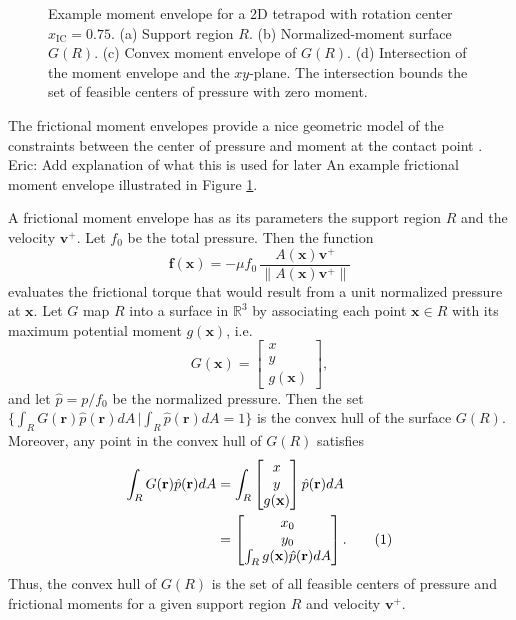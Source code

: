 \documentclass[conference]{IEEEtran}
\newcommand\numberthis{\addtocounter{equation}{1}\tag{\theequation}}
\newcommand{\EH}[1]{{\color{blue} {Eric: {#1}}  }}
\begin{document}
\begin{figure}[t]
\begin{subfigure}[b]{0.24\textwidth}
    \caption{}
  \end{subfigure}
  \caption{Example moment envelope for a 2D tetrapod with rotation
    center $x_{\text{IC}} = 0.75$. (a) Support region $R$. (b)
    Normalized-moment surface $G(R)$. (c) Convex moment envelope of
    $G(R)$. (d) Intersection of the moment envelope and the
    $xy$-plane. The intersection bounds the set of feasible centers of
    pressure with zero moment.}
  \label{fig:moment-envelope}
\end{figure}


The frictional moment envelopes provide a nice geometric model of the
constraints between the center of pressure and moment at the contact
point \cite{Mason}. \EH{Add explanation of what this is used for
  later} An example frictional moment envelope illustrated in Figure
\ref{fig:moment-envelope}.

A frictional moment envelope has as its parameters
the support region $R$ and the velocity $\mathbf{v}^+$.  Let $f_0$ be
the total pressure. Then the function
\begin{equation}
  \mathbf{f}(\mathbf{x}) = -\mu f_0\,\frac{A(\mathbf{x})\mathbf{v}^+}{\lVert A(\mathbf{x})\mathbf{v}^+ \rVert}\label{eq:unit-moment-at-x}
\end{equation}
evaluates the frictional torque that would result from a unit
normalized pressure at $\mathbf{x}$. Let $G$ map $R$ into a surface in
$\mathbb{R}^3$ by associating each point $\mathbf{x} \in R$ with its
maximum potential moment $g(\mathbf{x})$, i.e.
\begin{equation}
G(\mathbf{x}) =
\begin{bmatrix*}
  x\\
  y\\
  g(\mathbf{x})
\end{bmatrix*},
\end{equation}
and let $\hat{p} = p/f_0$ be the normalized pressure. Then the set
$\{\int_RG(\mathbf{r})\hat{p}(\mathbf{r})dA
\,|\int_R\hat{p}(\mathbf{r})dA=1 \}$
is the convex hull of the surface $G(R)$. Moreover, any point in the
convex hull of $G(R)$ satisfies
\begin{align*}
  \int_R G(\mathbf{r}) \hat{p}(\mathbf{r})dA &= \int_R 
  \begin{bmatrix*}
    x\\
    y\\
    g(\mathbf{x})
  \end{bmatrix*}
  \hat{p}(\mathbf{r})dA\\
  &= 
    \begin{bmatrix*}
      x_0\\
      y_0\\
      \int_R g(\mathbf{x}) \hat{p}(\mathbf{r})dA
    \end{bmatrix*}. \numberthis
\end{align*}
Thus, the convex hull of $G(R)$ is the set of all feasible centers of
pressure and frictional moments for a given support region $R$ and
velocity $\mathbf{v}^+$.
\end{document}
